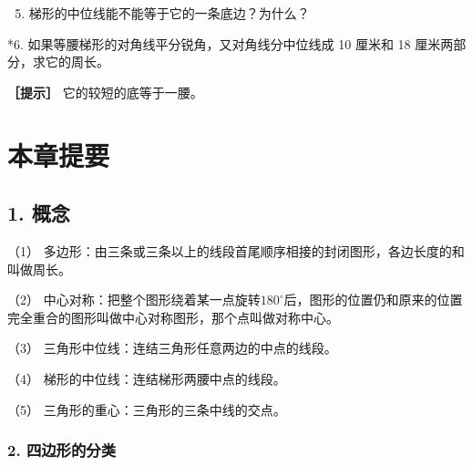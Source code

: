 \begin{enumerate}
\setcounter{enumi}{4}
\item
  梯形的中位线能不能等于它的一条底边？为什么？
\end{enumerate}

*6. 如果等腰梯形的对角线平分锐角，又对角线分中位线成 10 厘米和 18
厘米两部分，求它的周长。

\textbf{［提示］} 它的较短的底等于一腰。

\section{本章提要}

\subsection{1. 概念}

（1）
多边形：由三条或三条以上的线段首尾顺序相接的封闭图形，各边长度的和叫做周长。

（2）
中心对称：把整个图形绕着某一点旋转\(180^{\circ}\)后，图形的位置仍和原来的位置完全重合的图形叫做中心对称图形，那个点叫做对称中心。

（3） 三角形中位线：连结三角形任意两边的中点的线段。

（4） 梯形的中位线：连结梯形两腰中点的线段。

（5） 三角形的重心：三角形的三条中线的交点。

\subsubsection{2.
四边形的分类}

